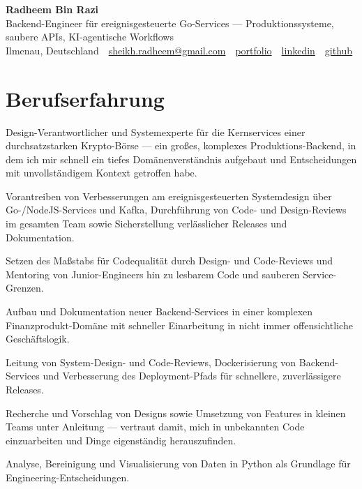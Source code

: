 \documentclass[11pt,a4paper]{resume}
\makeatletter
\newcommand{\Portfolio}{https://radheem.github.io/my-cv}
\newcommand{\PortfolioText}{portfolio}
\newcommand{\GitHub}{https://github.com/radheem}
\newcommand{\LinkedIn}{https://www.linkedin.com/in/radheem-razi}
\newcommand{\Email}{sheikh.radheem@gmail.com}
\makeatother
\begin{document}
\clearpage
{}

\begin{center}
  {\huge\bfseries Radheem Bin Razi}\\[3pt]
  {\large Backend-Engineer für ereignisgesteuerte Go-Services — Produktionssysteme, saubere APIs, KI-agentische Workflows}\\[6pt]
  \small
  Ilmenau, Deutschland \,\textbar\,
  \href{mailto:\Email}{\Email} \,\textbar\,
  \href{\Portfolio}{\PortfolioText} \,\textbar\,
  \href{\LinkedIn}{linkedin} \,\textbar\,
  \href{\GitHub}{github}
\end{center}
\vspace{2pt}

\section{Berufserfahrung}

\bullets
  \item Design-Verantwortlicher und Systemexperte für die Kernservices einer durchsatzstarken Krypto-Börse — ein großes, komplexes Produktions-Backend, in dem ich mir schnell ein tiefes Domänenverständnis aufgebaut und Entscheidungen mit unvollständigem Kontext getroffen habe.
  \item Vorantreiben von Verbesserungen am ereignisgesteuerten Systemdesign über Go-/NodeJS-Services und Kafka, Durchführung von Code- und Design-Reviews im gesamten Team sowie Sicherstellung verlässlicher Releases und Dokumentation.
  \item Setzen des Maßstabs für Codequalität durch Design- und Code-Reviews und Mentoring von Junior-Engineers hin zu lesbarem Code und sauberen Service-Grenzen.
\bulletsend
\vspace{3pt}
\bullets
  \item Aufbau und Dokumentation neuer Backend-Services in einer komplexen Finanzprodukt-Domäne mit schneller Einarbeitung in nicht immer offensichtliche Geschäftslogik.
  \item Leitung von System-Design- und Code-Reviews, Dockerisierung von Backend-Services und Verbesserung des Deployment-Pfads für schnellere, zuverlässigere Releases.
\bulletsend
\vspace{3pt}
\bullets
  \item Recherche und Vorschlag von Designs sowie Umsetzung von Features in kleinen Teams unter Anleitung — vertraut damit, mich in unbekannten Code einzuarbeiten und Dinge eigenständig herauszufinden.
  \item Analyse, Bereinigung und Visualisierung von Daten in Python als Grundlage für Engineering-Entscheidungen.
\bulletsend
\vspace{3pt}
\end{document}
